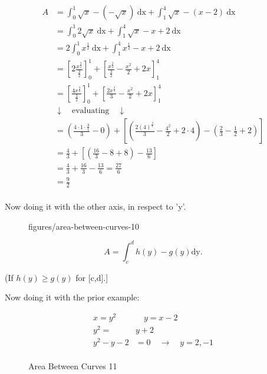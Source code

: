 \documentclass{book}
\begin{document}
\begin{align*}
    A&= \int_{0}^{1} \sqrt{x}-(-\sqrt{x}) \ \text{dx} + \int_{1}^{4} \sqrt{x}-(x-2)\ \text{dx}   \\
     &= \int_{0}^{1} 2\sqrt{x} \ \text{dx} + \int_{1}^{4} \sqrt{x} - x + 2 \ \text{dx}    \\
     &= 2 \int_{0}^{1} x^{\frac{1}{2}}\ \text{dx}+ \int_{1}^{4} x^{\frac{1}{2}}-x+2 \ \text{dx}   \\
     &= \left[2\frac{x^{\frac{3}{2}}}{\frac{3}{2}}\right]_0^1+ \left[\frac{x^{\frac{3}{2}}}{\frac{3}{2}}-\frac{x^2}{2}+2x\right]_1^4 \\
     &= \left[\frac{4x^{\frac{3}{2}}}{\frac{3}{2}}\right]_0^1 + \left[ \frac{2x^{\frac{3}{1}}}{3}-\frac{x^2}{2}+2x \right]_1^4 \\
     &     \downarrow  \quad\text{evaluating}\quad \downarrow \\
     &= \left( \frac{4\cdot 1\cdot \frac{3}{1}}{3}-0 \right)+ \left[\left(
     \frac{2(4)^{\frac{3}{1}}}{3}- \frac{4^2}{2}+2\cdot 4  \right)-\left( \frac{2}{3}-\frac{1}{2}+2 \right)  \right]   \\
     &= \frac{4}{3}+\left[ \left(\frac{16}{3}-8+8\right) -\frac{13}{6}\right]  \\
     &= \frac{4}{3} + \frac{16}{3}-\frac{13}{6}= \frac{27}{6} \\
     &=\frac{9}{2}\\
\end{align*}

Now doing it with the other axis, in respect to 'y'.

\begin{figure}[ht]
    \centering
    \caption{figures/area-between-curves-10}
    \label{fig:area-between-curves-10}
\end{figure}

\[
A= \int_{c}^{d} h(y)-g(y) \text{dy} 
.\] 

(If $h(y) \geq g(y)$ for [c,d].]

Now doing it with the prior example:

\begin{align*}
    x=y^2 \quad & \quad y=x-2\\
    y^2=& y+2\\
    y^2-y-2 &= 0 \quad \to \quad y=2,-1 \\ 
\end{align*}

\begin{figure}[ht]
    \centering
    \caption{Area Between Curves 11}
    \label{fig:area-between-curves-11}
\end{figure}
\end{document}
